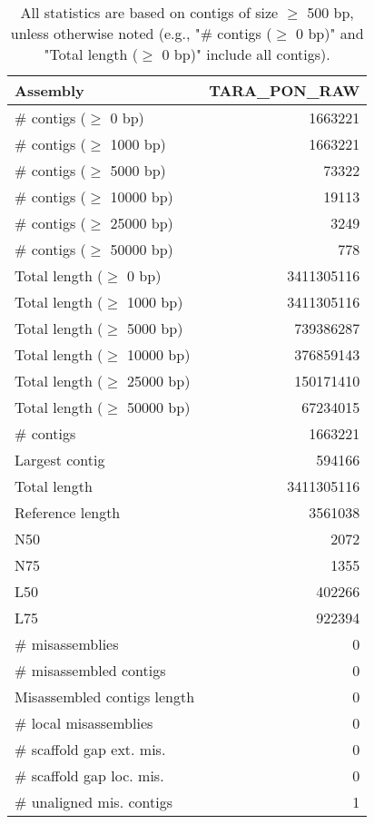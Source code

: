 \documentclass[12pt,a4paper]{article}
\begin{document}
\begin{table}[ht]
\begin{center}
\caption{All statistics are based on contigs of size $\geq$ 500 bp, unless otherwise noted (e.g., "\# contigs ($\geq$ 0 bp)" and "Total length ($\geq$ 0 bp)" include all contigs).}
\begin{tabular}{|l*{1}{|r}|}
\hline
Assembly & TARA\_PON\_RAW \\ \hline
\# contigs ($\geq$ 0 bp) & 1663221 \\ \hline
\# contigs ($\geq$ 1000 bp) & 1663221 \\ \hline
\# contigs ($\geq$ 5000 bp) & 73322 \\ \hline
\# contigs ($\geq$ 10000 bp) & 19113 \\ \hline
\# contigs ($\geq$ 25000 bp) & 3249 \\ \hline
\# contigs ($\geq$ 50000 bp) & 778 \\ \hline
Total length ($\geq$ 0 bp) & 3411305116 \\ \hline
Total length ($\geq$ 1000 bp) & 3411305116 \\ \hline
Total length ($\geq$ 5000 bp) & 739386287 \\ \hline
Total length ($\geq$ 10000 bp) & 376859143 \\ \hline
Total length ($\geq$ 25000 bp) & 150171410 \\ \hline
Total length ($\geq$ 50000 bp) & 67234015 \\ \hline
\# contigs & 1663221 \\ \hline
Largest contig & 594166 \\ \hline
Total length & 3411305116 \\ \hline
Reference length & 3561038 \\ \hline
N50 & 2072 \\ \hline
N75 & 1355 \\ \hline
L50 & 402266 \\ \hline
L75 & 922394 \\ \hline
\# misassemblies & 0 \\ \hline
\# misassembled contigs & 0 \\ \hline
Misassembled contigs length & 0 \\ \hline
\# local misassemblies & 0 \\ \hline
\# scaffold gap ext. mis. & 0 \\ \hline
\# scaffold gap loc. mis. & 0 \\ \hline
\# unaligned mis. contigs & 1 \\ \hline

\end{tabular}
\end{center}
\end{table}
\end{document}
